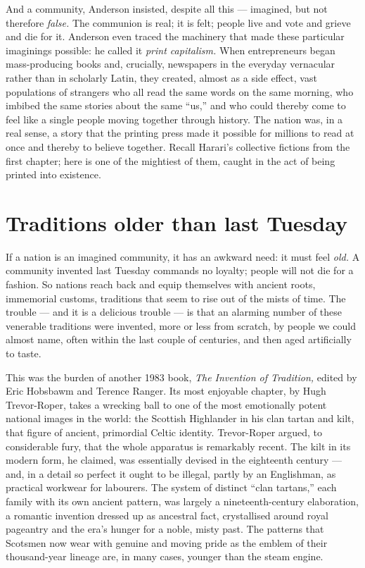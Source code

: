 And a community, Anderson insisted, despite all this — imagined, but not therefore \emph{false.} The communion is real; it is felt; people live and vote and grieve and die for it. Anderson even traced the machinery that made these particular imaginings possible: he called it \emph{print capitalism.} When entrepreneurs began mass-producing books and, crucially, newspapers in the everyday vernacular rather than in scholarly Latin, they created, almost as a side effect, vast populations of strangers who all read the same words on the same morning, who imbibed the same stories about the same ``us,'' and who could thereby come to feel like a single people moving together through history. The nation was, in a real sense, a story that the printing press made it possible for millions to read at once and thereby to believe together. Recall Harari's collective fictions from the first chapter; here is one of the mightiest of them, caught in the act of being printed into existence.

\section*{Traditions older than last Tuesday}

If a nation is an imagined community, it has an awkward need: it must feel \emph{old.} A community invented last Tuesday commands no loyalty; people will not die for a fashion. So nations reach back and equip themselves with ancient roots, immemorial customs, traditions that seem to rise out of the mists of time. The trouble — and it is a delicious trouble — is that an alarming number of these venerable traditions were invented, more or less from scratch, by people we could almost name, often within the last couple of centuries, and then aged artificially to taste.

This was the burden of another 1983 book, \emph{The Invention of Tradition,} edited by Eric Hobsbawm and Terence Ranger. Its most enjoyable chapter, by Hugh Trevor-Roper, takes a wrecking ball to one of the most emotionally potent national images in the world: the Scottish Highlander in his clan tartan and kilt, that figure of ancient, primordial Celtic identity. Trevor-Roper argued, to considerable fury, that the whole apparatus is remarkably recent. The kilt in its modern form, he claimed, was essentially devised in the eighteenth century — and, in a detail so perfect it ought to be illegal, partly by an Englishman, as practical workwear for labourers. The system of distinct ``clan tartans,'' each family with its own ancient pattern, was largely a nineteenth-century elaboration, a romantic invention dressed up as ancestral fact, crystallised around royal pageantry and the era's hunger for a noble, misty past. The patterns that Scotsmen now wear with genuine and moving pride as the emblem of their thousand-year lineage are, in many cases, younger than the steam engine.

